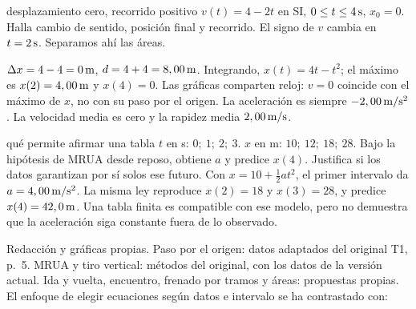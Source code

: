 \documentclass[11pt,a4paper]{article}
\begin{document}
\begin{examplebox}{desplazamiento cero, recorrido positivo}
 $v(t)=4-2t$ en SI, $0\le t\le4\,\mathrm{s}$, $x_0=0$.
Halla cambio de sentido, posici\'on final y recorrido.
\solutionblock
{} El signo de $v$ cambia en $t=2\,\mathrm{s}$. Separamos ah\'i las \'areas.
\begin{center}
\end{center}
$\Delta x=4-4=0\,\mathrm{m}$, $d=4+4=8,00\,\mathrm{m}$.
Integrando, $x(t)=4t-t^2$; el m\'aximo es $x(2)=4,00\,\mathrm{m}$ y $x(4)=0$.
 Las gr\'aficas comparten reloj: $v=0$ coincide con el
m\'aximo de $x$, no con su paso por el origen. La aceleraci\'on es siempre
$-2,00\,\mathrm{m/s^2}$. La velocidad media es cero y la rapidez media $2,00\,\mathrm{m/s}$.
\end{examplebox}

\begin{exercisebox}{qu\'e permite afirmar una tabla}
$t$ en s: $0;\ 1;\ 2;\ 3$.
$x$ en m: $10;\ 12;\ 18;\ 28$.
Bajo la hip\'otesis de MRUA desde reposo, obtiene $a$ y predice $x(4)$.
Justifica si los datos garantizan por s\'i solos ese futuro.
\solutionblock
Con $x=10+\tfrac12at^2$, el primer intervalo da $a=4,00\,\mathrm{m/s^2}$.
La misma ley reproduce $x(2)=18$ y $x(3)=28$, y predice
$x(4)=42,0\,\mathrm{m}$. Una tabla finita es compatible con ese modelo,
pero no demuestra que la aceleraci\'on siga constante fuera de lo observado.
\end{exercisebox}

Redacci\'on y gr\'aficas propias. Paso por el origen: datos adaptados del original
T1, p.\ 5. MRUA y tiro vertical: m\'etodos del original, con los datos de la
versi\'on actual. Ida y vuelta, encuentro, frenado por tramos y \'areas: propuestas propias.
El enfoque de elegir ecuaciones seg\'un datos e intervalo se ha contrastado con:
\end{document}
